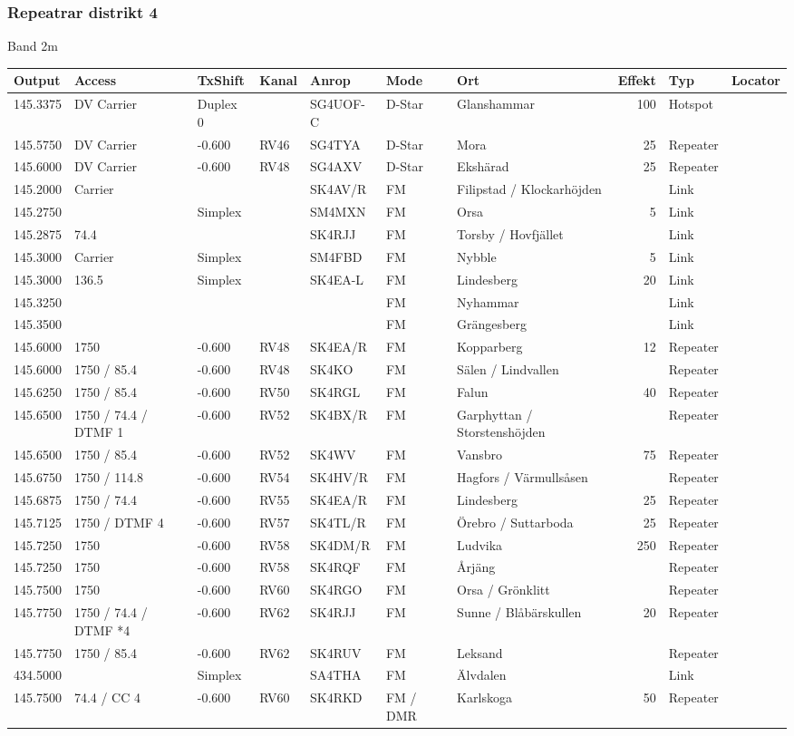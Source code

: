 \subsubsection{Repeatrar distrikt 4}
\large{Band 2m}
\begin{longtable}{lllllllrlr}
Output & Access & TxShift & Kanal & Anrop & Mode & Ort & Effekt & Typ & Locator \\ \hline
145.3375&DV Carrier&Duplex 0&&SG4UOF-C&D-Star&Glanshammar&100&Hotspot&\\
145.5750&DV Carrier&-0.600&RV46&SG4TYA&D-Star&Mora&25&Repeater&\\
145.6000&DV Carrier&-0.600&RV48&SG4AXV&D-Star&Ekshärad&25&Repeater&\\
145.2000&Carrier&&&SK4AV/R&FM&Filipstad / Klockarhöjden&&Link&\\
145.2750&&Simplex&&SM4MXN&FM&Orsa&5&Link&\\
145.2875&74.4&&&SK4RJJ&FM&Torsby / Hovfjället&&Link&\\
145.3000&Carrier&Simplex&&SM4FBD&FM&Nybble&5&Link&\\
145.3000&136.5&Simplex&&SK4EA-L&FM&Lindesberg&20&Link&\\
145.3250&&&&&FM&Nyhammar&&Link&\\
145.3500&&&&&FM&Grängesberg&&Link&\\
145.6000&1750&-0.600&RV48&SK4EA/R&FM&Kopparberg&12&Repeater&\\
145.6000&1750 / 85.4&-0.600&RV48&SK4KO&FM&Sälen / Lindvallen&&Repeater&\\
145.6250&1750 / 85.4&-0.600&RV50&SK4RGL&FM&Falun&40&Repeater&\\
145.6500&1750 / 74.4 / DTMF 1&-0.600&RV52&SK4BX/R&FM&Garphyttan / Storstenshöjden&&Repeater&\\
145.6500&1750 / 85.4&-0.600&RV52&SK4WV&FM&Vansbro&75&Repeater&\\
145.6750&1750 / 114.8&-0.600&RV54&SK4HV/R&FM&Hagfors / Värmullsåsen&&Repeater&\\
145.6875&1750 / 74.4&-0.600&RV55&SK4EA/R&FM&Lindesberg&25&Repeater&\\
145.7125&1750 / DTMF 4&-0.600&RV57&SK4TL/R&FM&Örebro / Suttarboda&25&Repeater&\\
145.7250&1750&-0.600&RV58&SK4DM/R&FM&Ludvika&250&Repeater&\\
145.7250&1750&-0.600&RV58&SK4RQF&FM&Årjäng&&Repeater&\\
145.7500&1750&-0.600&RV60&SK4RGO&FM&Orsa / Grönklitt&&Repeater&\\
145.7750&1750 / 74.4 / DTMF *4&-0.600&RV62&SK4RJJ&FM&Sunne / Blåbärskullen&20&Repeater&\\
145.7750&1750 / 85.4&-0.600&RV62&SK4RUV&FM&Leksand&&Repeater&\\
434.5000&&Simplex&&SA4THA&FM&Älvdalen&&Link&\\
145.7500&74.4 / CC 4&-0.600&RV60&SK4RKD&FM / DMR&Karlskoga&50&Repeater&\\
\end{longtable}
